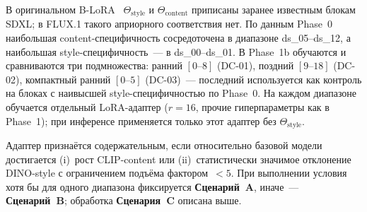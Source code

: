 В оригинальном B-LoRA~\cite{frenkel2024blora} $\Theta_\text{style}$ и $\Theta_\text{content}$ приписаны заранее известным блокам SDXL; в FLUX.1 такого априорного соответствия нет. По данным Phase~0 наибольшая content-специфичность сосредоточена в диапазоне ds\_05--ds\_12, а наибольшая style-специфичность~--- в ds\_00--ds\_01. В Phase~1b обучаются и сравниваются три подмножества: ранний $[0\text{--}8]$ (DC-01), поздний $[9\text{--}18]$ (DC-02), компактный ранний $[0\text{--}5]$ (DC-03)~--- последний используется как контроль на блоках с наивысшей style-специфичностью по Phase~0. На каждом диапазоне обучается отдельный LoRA-адаптер ($r{=}16$, прочие гиперпараметры как в Phase~1); при инференсе применяется только этот адаптер без $\Theta_\text{style}$.

Адаптер признаётся содержательным, если относительно базовой модели достигается (i)~рост CLIP-content или (ii)~статистически значимое отклонение DINO-style с ограничением подъёма фактором~$<\!5$. При выполнении условия хотя бы для одного диапазона фиксируется \textbf{Сценарий~A}, иначе~--- \textbf{Сценарий~B}; обработка \textbf{Сценария~C} описана выше.
